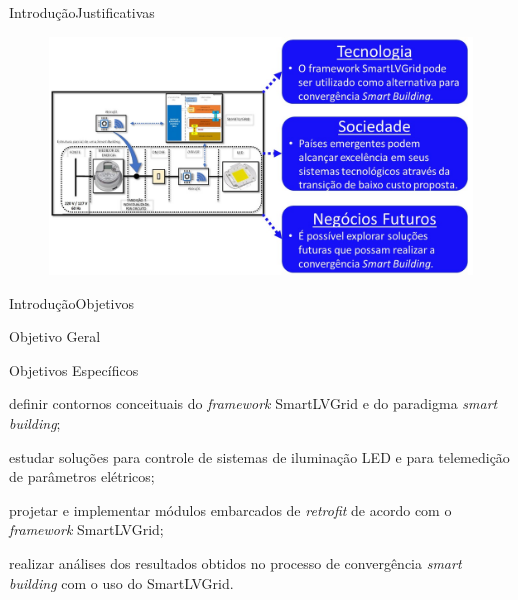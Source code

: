 \begin{frame}{Introdução}{Justificativas}
\vspace{-0.64cm}
\begin{figure}[htp]
	\centering
	\caption{}
	\includegraphics[width=0.97\linewidth]{img/6.jpg}
    \hspace{5cm}
    \vspace{5cm}
\end{figure}

\end{frame}

\begin{frame}{Introdução}{Objetivos}
\begin{block}{Objetivo Geral}
\end{block}

\begin{block}{Objetivos Específicos}
\begin{itemize}
\small{	\item definir contornos conceituais do \textit{framework} SmartLVGrid e do paradigma \textit{smart building};
	\item estudar soluções para controle de sistemas de iluminação LED e para telemedição de parâmetros elétricos;
	\item projetar e implementar módulos embarcados de \textit{retrofit} de acordo com o \textit{framework} SmartLVGrid;
	\item realizar análises dos resultados obtidos no processo de convergência \textit{smart building} com o uso do SmartLVGrid.}
\end{itemize}
\end{block}
\end{frame}

